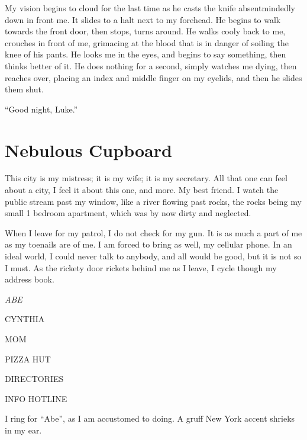 My vision begins to cloud for the last time as he casts the knife
absentmindedly down in front me. It slides to a halt next to my
forehead. He begins to walk towards the front door, then stops,
turns around. He walks cooly back to me, crouches in front of me,
grimacing at the blood that is in danger of soiling the knee of his
pants. He looks me in the eyes, and begins to say something, then
thinks better of it. He does nothing for a second, simply watches
me dying, then reaches over, placing an index and middle finger on
my eyelids, and then he slides them shut.



``Good night, Luke.'' 
 



\chapter{Nebulous Cupboard}





This city is my mistress; it is my wife; it is my secretary. All
that one can feel about a city, I feel it about this one, and more.
My best friend. I watch the public stream past my window, like a
river flowing past rocks, the rocks being my small 1 bedroom
apartment, which was by now dirty and neglected.



When I leave for my patrol, I do not check for my gun. It is as
much a part of me as my toenails are of me. I am forced to bring as
well, my cellular phone. In an ideal world, I could never talk to
anybody, and all would be good, but it is not so I must. As the
rickety door rickets behind me as I leave, I cycle though my
address book.



{\em ABE



CYNTHIA



MOM



PIZZA HUT



DIRECTORIES



INFO HOTLINE}



I ring for ``Abe'', as I am accustomed to doing. A gruff
New York accent shrieks in my ear.



